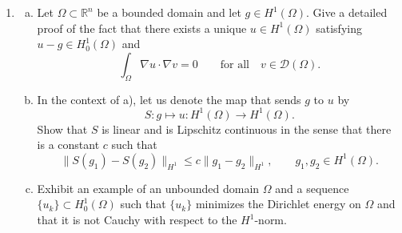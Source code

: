 \documentclass[11pt]{amsart}
\newcommand{\R}{\mathbb{R}}
\newcommand{\tstD}{\mathscr{D}}
\begin{document}
\begin{enumerate}[1.]
\begin{enumerate}[a)]
Prove the {\em Sobolev inequality}
$$
\|u\|_{L^\infty} \leq 2^{1-1/p} \|u\|_{1,p},
\qquad u\in H^{1,p}(I).
$$
\item
Since $H^{1,p}(I)$ is a subspace of $L^p(I)$, an element of $H^{1,p}(I)$ is an equivalence class of functions that differ on sets of measure zero.
So one can change the values of a function on a set of measure zero, and it would still correspond to the same element in $H^{1,p}(I)$.
Make sense of, and prove the statement that the elements of $H^{1,p}(I)$ are continuous functions.
\item
Prove the {\em Friedrichs inequality}
$$
\|u\|_{L^p}^p \leq 2^{p-1} \|u'\|_{L^p}^p + 2^{p-1} |u(\xi)|^p,
\qquad u\in H^{1,p}(I),
\quad \xi\in[0,1].
$$
In particular, make sense of the derivative $u'$ appearing in the right hand side.
\item
Let $H^{1,p}_0(I)$ be the closure of $C^1_c(I)$ in $H^{1,p}(I)$.
Show that 
$$
H^{1,p}_0(I) = \{u\in H^{1,p}(I) : u(0)=u(1)=0\}.
$$
\item
Prove the {\em Poincar\'e inequality}
$$
\|u\|_{L^p}^p \leq 2^{p-1} \|u'\|_{L^p}^p + 2^{p-1} \big| \int_I u \big|^p,
\qquad u\in H^{1,p}(I).
$$
\end{enumerate}
\item
\begin{enumerate}[a)]
\item
Let $\Omega\subset\R^n$ be a bounded domain and let $g\in H^1(\Omega)$.
Give a detailed proof of the fact that there exists a unique $u\in H^1(\Omega)$ satisfying $u-g\in H^1_0(\Omega)$ and
$$
\int_\Omega \nabla u \cdot \nabla v = 0
\qquad\textrm{for all}\quad 
v\in\tstD(\Omega).
$$
\item
In the context of a),
let us denote the map that sends $g$ to $u$ by 
$$
S:g\mapsto u:H^1(\Omega)\to H^1(\Omega).
$$
Show that $S$ is linear and is Lipschitz continuous in the sense that there is a constant $c$ such that
$$
\|S(g_1)-S(g_2)\|_{H^1} \leq c \|g_1-g_2\|_{H^1},
\qquad
g_1,g_2\in H^1(\Omega).
$$
\item
Exhibit an example of an unbounded domain $\Omega$ and a sequence $\{u_k\}\subset H^1_0(\Omega)$ 
such that $\{u_k\}$ minimizes the Dirichlet energy on $\Omega$ and that it is not Cauchy with respect to the $H^1$-norm.
\end{enumerate}
\end{enumerate}
\end{document}
